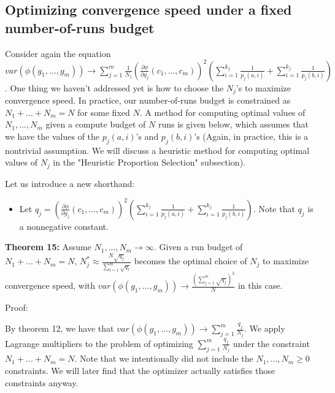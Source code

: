 \documentclass{article}
\begin{document}
\subsection{Optimizing convergence speed under a fixed number-of-runs budget}

Consider again the equation $\displaystyle var\left( \phi \left( g_{1} ,...,g_{m}\right)\right)\rightarrow \sum _{j=1}^{m}\frac{1}{N_{j}}\left(\frac{\partial \phi }{\partial g_{j}}\left( c_{1} ,...,c_{m}\right)\right)^{2}\left(\sum _{i=1}^{k_{j}}\frac{1}{p_{j}\left( a,i\right)} +\sum _{i=1}^{k_{j}}\frac{1}{p_{j}\left( b,i\right)}\right)$. One thing we haven't addressed yet is how to choose the $\displaystyle N_{j}$'s to maximize convergence speed. In practice, our number-of-runs budget is constrained as $\displaystyle N_{1} +...+N_{m} =N$ for some fixed $\displaystyle N$. A method for computing optimal values of $\displaystyle N_{1} ,...,N_{m}$ given a compute budget of $\displaystyle N$ runs is given below, which assumes that we have the values of the $\displaystyle p_{j}\left( a,i\right)$'s and $\displaystyle p_{j}\left( b,i\right)$'s (Again, in practice, this is a nontrivial assumption. We will discuss a heuristic method for computing optimal values of $\displaystyle N_{j}$ in the "Heuristic Proportion Selection" subsection).



Let us introduce a new shorthand:
\begin{itemize}
\item Let $\displaystyle q_{j} =\left(\frac{\partial \phi }{\partial g_{j}}\left( c_{1} ,...,c_{m}\right)\right)^{2}\left(\sum _{i=1}^{k_{j}}\frac{1}{p_{j}\left( a,i\right)} +\sum _{i=1}^{k_{j}}\frac{1}{p_{j}\left( b,i\right)}\right)$. Note that $\displaystyle q_{j}$ is a nonnegative constant.
\end{itemize}



\textbf{Theorem 15:} Assume $\displaystyle N_{1} ,...,N_{m}\rightarrow \infty $. Given a run budget of $\displaystyle N_{1} +...+N_{m} =N$, $\displaystyle N_{j}^{*} \approx \frac{N\sqrt{q_{j}}}{\sum _{l=1}^{m}\sqrt{q_{l}}}$ becomes the optimal choice of $\displaystyle N_{j}$ to maximize convergence speed, with $\displaystyle var\left( \phi \left( g_{1} ,...,g_{m}\right)\right)\rightarrow \frac{\left(\sum _{j=1}^{m}\sqrt{q_{j}}\right)^{2}}{N}$ in this case.



Proof:

By theorem 12, we have that $\displaystyle var\left( \phi \left( g_{1} ,...,g_{m}\right)\right)\rightarrow \sum _{j=1}^{m}\frac{q_{j}}{N_{j}}$. We apply Lagrange multipliers to the problem of optimizing $\displaystyle \sum _{j=1}^{m}\frac{q_{j}}{N_{j}}$ under the constraint $\displaystyle N_{1} +...+N_{m} =N$. Note that we intentionally did not include the $\displaystyle N_{1} ,...,N_{m} \geqslant 0$ constraints. We will later find that the optimizer actually satisfies those constraints anyway.
\end{document}
